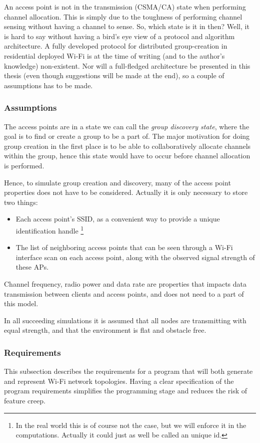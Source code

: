 An access point is not in the transmission (CSMA/CA) state when performing channel allocation. This is simply due to the toughness of performing channel sensing without
having a channel to sense. So, which state is it in then? Well, it is hard to say without having a bird's eye view of a protocol and algorithm architecture. A fully developed protocol
for distributed group-creation in residential deployed Wi-Fi is at the time of writing (and to the author's knowledge) non-existent. Nor will a full-fledged architecture be presented in
this thesis (even though suggestions will be made at the end), so a couple of assumptions has to be made. 

\subsubsection{Assumptions}
The access points are in a state we can call the \textit{group discovery state}, where the goal is to find or create a group to be a part of.
The major motivation for doing group creation in the first place is to be able to collaboratively allocate channels within the group, hence this state would
have to occur before channel allocation is performed. 

Hence, to simulate group creation and discovery, many of the access point properties does not have to be considered. Actually it is only necessary to store two things:
\begin{itemize}
	\item Each access point's SSID, as a convenient way to provide a unique identification handle \footnote{In the real world this is of course not the case,
but we will enforce it in the computations. Actually it could just as well be called an unique id.}
	\item The list of neighboring access points that can be seen through a Wi-Fi interface scan on each access point, along with the observed signal strength of these APs.
\end{itemize}
Channel frequency, radio power and data rate are properties that impacts data transmission between clients and access points, and does not need to a 
part of this model. 

In all succeeding simulations it is assumed that all nodes are transmitting with equal strength, and that the environment is flat and obstacle free. 

\subsubsection{Requirements}
This subsection describes the requirements for a program that will both generate and represent Wi-Fi network topologies. Having a clear specification of the program requirements
simplifies the programming stage and reduces the risk of feature creep. 

